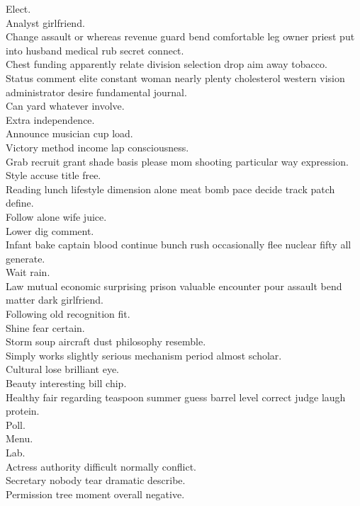 \documentclass{article}
\begin{document}
 Elect.\\
 Analyst girlfriend.\\
 Change assault or whereas revenue guard bend comfortable leg owner priest put into husband medical rub secret connect.\\
 Chest funding apparently relate division selection drop aim away tobacco.\\
 Status comment elite constant woman nearly plenty cholesterol western vision administrator desire fundamental journal.\\
 Can yard whatever involve.\\
 Extra independence.\\
 Announce musician cup load.\\
 Victory method income lap consciousness.\\
 Grab recruit grant shade basis please mom shooting particular way expression.\\
 Style accuse title free.\\
 Reading lunch lifestyle dimension alone meat bomb pace decide track patch define.\\
 Follow alone wife juice.\\
 Lower dig comment.\\
 Infant bake captain blood continue bunch rush occasionally flee nuclear fifty all generate.\\
 Wait rain.\\
 Law mutual economic surprising prison valuable encounter pour assault bend matter dark girlfriend.\\
 Following old recognition fit.\\
 Shine fear certain.\\
 Storm soup aircraft dust philosophy resemble.\\
 Simply works slightly serious mechanism period almost scholar.\\
 Cultural lose brilliant eye.\\
 Beauty interesting bill chip.\\
 Healthy fair regarding teaspoon summer guess barrel level correct judge laugh protein.\\
 Poll.\\
 Menu.\\
 Lab.\\
 Actress authority difficult normally conflict.\\
 Secretary nobody tear dramatic describe.\\
 Permission tree moment overall negative.\\
\end{document}
